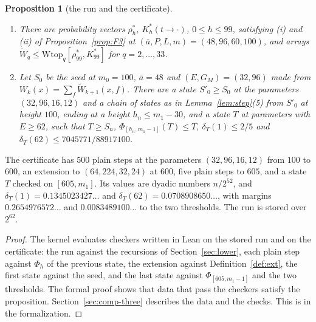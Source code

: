 \documentclass[11pt]{amsart}
\newtheorem{proposition}[theorem]{Proposition}
\theoremstyle{definition}
\numberwithin{equation}{section}
\newcommand{\lean}[1]{\ignorespaces}
\newcommand{\computed}[1]{\ignorespaces}
\begin{document}
\begin{proposition}[the run and the certificate]\label{prop:m1run}\lean{FrogModel.D3.Chain.m1run_certS_proof, FrogModel.D3.Iface.m1run_certS, FrogModel.D3.Iface.M1Run.Holds, FrogModel.D3.Iface.CertS1, FrogModel.D3.Iface.P0, FrogModel.D3.Iface.topMass}\computed{code/m1run/run.sh, code/d3cert/run.sh, code/d3cert/out/run.out, code/d3chain/gen.sh, code/formal-proof/main_axioms.lean}
\begin{enumerate}
\item There are probability vectors $\rho^*_h$, $K^*_h(t\to\cdot)$, $0\le h\le99$, satisfying (i) and (ii) of Proposition~\ref{prop:F3} at $(\bar a,P,L,m)=(48,96,60,100)$, and arrays $\widetilde W_q\le\mathrm{Wtop}_q[\rho^*_{99},K^*_{99}]$ for $q=2,\dots,33$.
\item Let $S_0$ be the seed at $m_0=100$, $\bar a=48$ and $(E,G_M)=(32,96)$ made from $W_k(x)=\sum_f\widetilde W_{k+1}(x,f)$. There are a state $S'_0\ge S_0$ at the parameters $(32,96,16,12)$ and a chain of states as in Lemma~\ref{lem:step}(5) from $S'_0$ at height $100$, ending at a height $h_n\le m_1-30$, and a state $T$ at parameters with $E\ge62$, such that $T\ge S_n$, $\Phi_{[h_n,m_1-1]}(T)\le T$, $\delta_T(1)\le2/5$ and $\delta_T(62)\le7045771/88917100$.
\end{enumerate}
\end{proposition}

The certificate has $500$ plain steps at the parameters $(32,96,16,12)$ from $100$ to $600$, an extension to $(64,224,32,24)$ at $600$, five plain steps to $605$, and a state $T$ checked on $[605,m_1]$. Its values are dyadic numbers $n/2^{52}$, and $\delta_T(1)=0.1345023427\ldots$ and $\delta_T(62)=0.0708908650\ldots$, with margins $0.2654976572\ldots$ and $0.0083489100\ldots$ to the two thresholds. The run is stored over $2^{62}$.\computed{code/d3cert/run.sh, code/d3cert/out/run.out, code/m1run/run.sh}

\begin{proof}
The kernel evaluates checkers written in Lean on the stored run and on the certificate: the run against the recursions of Section~\ref{sec:lower}, each plain step against $\Phi_h$ of the previous state, the extension against Definition~\ref{def:ext}, the first state against the seed, and the last state against $\Phi_{[605,m_1-1]}$ and the two thresholds. The formal proof shows that data that pass the checkers satisfy the proposition. Section~\ref{sec:comp-three} describes the data and the checks. This is  in the formalization.\computed{code/formal-proof/main_axioms.lean, records/build/release-build.sh, records/build/out/release-build.out}
\end{proof}
\end{document}
